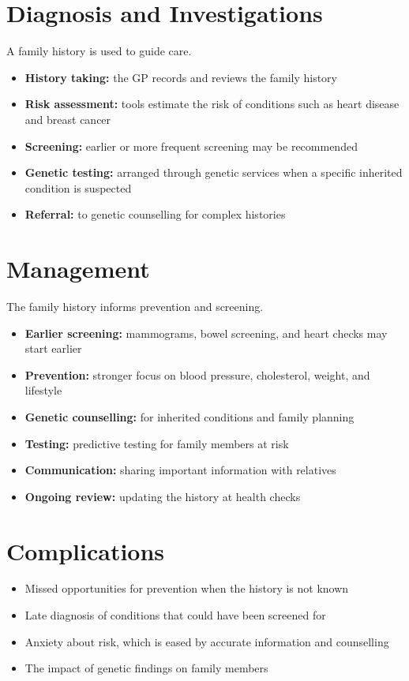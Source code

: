 \section*{Diagnosis and Investigations}
A family history is used to guide care.
\begin{itemize}
    \item \textbf{History taking:} the GP records and reviews the family history
    \item \textbf{Risk assessment:} tools estimate the risk of conditions such as heart disease and breast cancer
    \item \textbf{Screening:} earlier or more frequent screening may be recommended
    \item \textbf{Genetic testing:} arranged through genetic services when a specific inherited condition is suspected
    \item \textbf{Referral:} to genetic counselling for complex histories
\end{itemize}

\section*{Management}
The family history informs prevention and screening.
\begin{itemize}
    \item \textbf{Earlier screening:} mammograms, bowel screening, and heart checks may start earlier
    \item \textbf{Prevention:} stronger focus on blood pressure, cholesterol, weight, and lifestyle
    \item \textbf{Genetic counselling:} for inherited conditions and family planning
    \item \textbf{Testing:} predictive testing for family members at risk
    \item \textbf{Communication:} sharing important information with relatives
    \item \textbf{Ongoing review:} updating the history at health checks
\end{itemize}

\section*{Complications}
\begin{itemize}
    \item Missed opportunities for prevention when the history is not known
    \item Late diagnosis of conditions that could have been screened for
    \item Anxiety about risk, which is eased by accurate information and counselling
    \item The impact of genetic findings on family members
\end{itemize}

